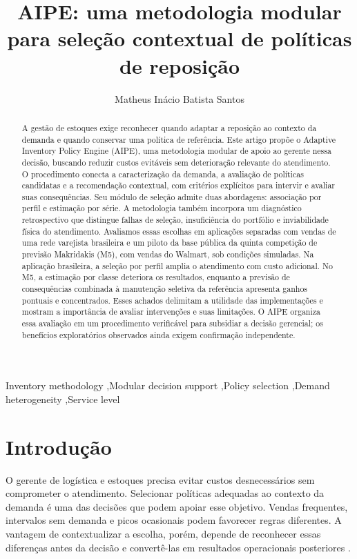 \documentclass[preprint,12pt]{elsarticle}
\begin{document}
\begin{frontmatter}
\title{AIPE: uma metodologia modular para seleção contextual de políticas de reposição}
\author[ufal]{Matheus Inácio Batista Santos}
\begin{abstract}
A gestão de estoques exige reconhecer quando adaptar a reposição ao contexto da demanda e quando conservar uma política de referência. Este artigo propõe o Adaptive Inventory Policy Engine (AIPE), uma metodologia modular de apoio ao gerente nessa decisão, buscando reduzir custos evitáveis sem deterioração relevante do atendimento. O procedimento conecta a caracterização da demanda, a avaliação de políticas candidatas e a recomendação contextual, com critérios explícitos para intervir e avaliar suas consequências. Seu módulo de seleção admite duas abordagens: associação por perfil e estimação por série. A metodologia também incorpora um diagnóstico retrospectivo que distingue falhas de seleção, insuficiência do portfólio e inviabilidade física do atendimento. Avaliamos essas escolhas em aplicações separadas com vendas de uma rede varejista brasileira e um piloto da base pública da quinta competição de previsão Makridakis (M5), com vendas do Walmart, sob condições simuladas. Na aplicação brasileira, a seleção por perfil amplia o atendimento com custo adicional. No M5, a estimação por classe deteriora os resultados, enquanto a previsão de consequências combinada à manutenção seletiva da referência apresenta ganhos pontuais e concentrados. Esses achados delimitam a utilidade das implementações e mostram a importância de avaliar intervenções e suas limitações. O AIPE organiza essa avaliação em um procedimento verificável para subsidiar a decisão gerencial; os benefícios exploratórios observados ainda exigem confirmação independente.

\end{abstract}
\begin{keyword}
Inventory methodology \sep Modular decision support \sep Policy selection \sep Demand heterogeneity \sep Service level
\end{keyword}
\end{frontmatter}

\section{Introdução}
O gerente de logística e estoques precisa evitar custos desnecessários sem comprometer o atendimento. Selecionar políticas adequadas ao contexto da demanda é uma das decisões que podem apoiar esse objetivo. Vendas frequentes, intervalos sem demanda e picos ocasionais podem favorecer regras diferentes. A vantagem de contextualizar a escolha, porém, depende de reconhecer essas diferenças antes da decisão e convertê-las em resultados operacionais posteriores \cite{Axsater2006InventoryControl}.
\end{document}

